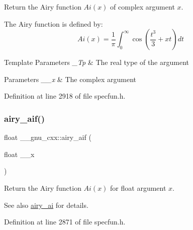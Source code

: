 Return the Airy function $ Ai(x) $ of complex argument $ x $.

The Airy function is defined by\+: \[ Ai(x) = \frac{1}{\pi}\int_0^\infty \cos \left(\frac{t^3}{3} + xt \right)dt \]


\begin{DoxyTemplParams}{Template Parameters}
{\em \+\_\+\+Tp} & The real type of the argument \\
\hline
\end{DoxyTemplParams}

\begin{DoxyParams}{Parameters}
{\em \+\_\+\+\_\+x} & The complex argument \\
\hline
\end{DoxyParams}


Definition at line 2918 of file specfun.\+h.

\mbox{\label{group__gnu__math__spec__func_gaf317ba724c44b3a8271fe341d9870173}} 
\subsubsection{\texorpdfstring{airy\+\_\+aif()}{airy\_aif()}}
{\footnotesize\ttfamily float \+\_\+\+\_\+gnu\+\_\+cxx\+::airy\+\_\+aif (\begin{DoxyParamCaption}\item[{float}]{\+\_\+\+\_\+x }\end{DoxyParamCaption})\hspace{0.3cm}{\ttfamily [inline]}}

Return the Airy function $ Ai(x) $ for {\ttfamily float} argument $ x $.

\begin{DoxySeeAlso}{See also}
\hyperlink{group__gnu__math__spec__func_gac84f8c4ad00ee677ad4d0b785925d983}{airy\+\_\+ai} for details. 
\end{DoxySeeAlso}


Definition at line 2871 of file specfun.\+h.

\mbox{\label{group__gnu__math__spec__func_ga800fdb61c672ae1831f4ca4250d657de}} 
